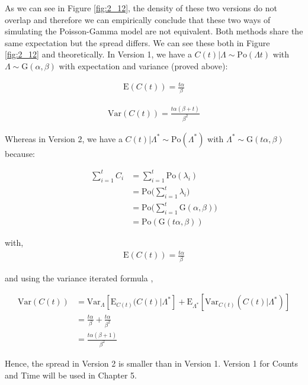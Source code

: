 As we can see in Figure \ref{fig:2_12}, the density of these two versions do not overlap and therefore we can empirically conclude that these two ways of simulating the Poisson-Gamma model are not equivalent. Both methods share the same expectation but the spread differs. We can see these both in Figure \ref{fig:2_12} and theoretically. In Version 1, we have a $C(t)|\Lambda\sim\textrm{Po}(\Lambda t)$ with $\Lambda\sim\textrm{G}(\alpha,\beta)$ with expectation and variance (proved above):


\begin{align*}
\textrm{E}(C(t))=\frac{t\alpha}{\beta}
\end{align*}

\begin{align*}
\textrm{Var}(C(t))=\frac{t\alpha(\beta+t)}{\beta^2}
\end{align*}

Whereas in Version 2, we have a $C(t)|\Lambda^*\sim\textrm{Po}(\Lambda^*)$ with $\Lambda^*\sim\textrm{G}(t\alpha,\beta)$ because:

\begin{align*}
\sum_{i=1}^t C_i &= \sum_{i=1}^t \textrm{Po}(\lambda_i)\\
&=\textrm{Po}\Bigg(\sum_{i=1}^t \lambda_i\Bigg)\\
&=\textrm{Po}\Bigg(\sum_{i=1}^t \textrm{G}(\alpha,\beta)\Bigg)\\
&=\textrm{Po}(\textrm{G}(t\alpha,\beta))
\end{align*}

with,
\begin{align*}
\textrm{E}(C(t))=\frac{t\alpha}{\beta}
\end{align*}

and using the variance iterated formula \citep{held2014applied},

\begin{align*}
\textrm{Var}(C(t))&= \textrm{Var}_{\Lambda}[\textrm{E}_{C(t)} (C(t)|\Lambda^*] + \textrm{E}_{\Lambda^*}[\textrm{Var}_{C(t)}(C(t)|\Lambda^*)]\\
&=\frac{t\alpha}{\beta}+\frac{t\alpha}{\beta^2}\\
&=\frac{t\alpha(\beta+1)}{\beta^2}
\end{align*}

Hence, the spread in Version 2 is smaller than in Version 1. Version 1 for Counts and Time will be used in Chapter 5.


